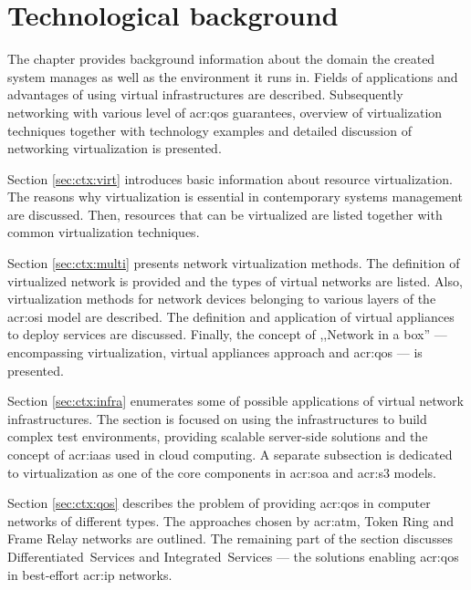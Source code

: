 \documentclass[11pt,openany]{book}
\begin{document}
  \chapter{Technological background}
  \label{chap:bck}

    The chapter provides background information about the domain the created system manages as well as the environment
    it runs in. Fields of applications and advantages of using virtual infrastructures are described. Subsequently
    networking with various level of \gls{acr:qos} guarantees, overview of virtualization techniques together with
    technology examples and detailed discussion of networking virtualization is presented.

    Section \ref{sec:ctx:virt} introduces basic information about resource virtualization. The reasons why
    virtualization is essential in contemporary systems management are discussed. Then, resources that can be
    virtualized are listed together with common virtualization techniques.

    Section \ref{sec:ctx:multi} presents network virtualization methods. The definition of virtualized network is
    provided and the types of virtual networks are listed. Also, virtualization methods for network devices belonging to
    various layers of the \gls{acr:osi} model are described. The definition and application of virtual appliances to
    deploy services are discussed. Finally, the concept of ,,Network in a box'' --- encompassing virtualization, virtual
    appliances approach and \gls{acr:qos} --- is presented.

    Section \ref{sec:ctx:infra} enumerates some of possible applications of virtual network infrastructures. The section
    is focused on using the infrastructures to build complex test environments, providing scalable server-side solutions
    and the concept of \gls{acr:iaas} used in cloud computing. A separate subsection is dedicated to virtualization as
    one of the core components in \gls{acr:soa} and \gls{acr:s3} models.

    Section \ref{sec:ctx:qos} describes the problem of providing \gls{acr:qos} in computer networks of different types.
    The approaches chosen by \gls{acr:atm}, Token Ring and Frame Relay networks are outlined. The remaining part of the
    section discusses Differentiated~Services and Integrated~Services --- the solutions enabling \gls{acr:qos} in
    best-effort \gls{acr:ip} networks.

\end{document}
